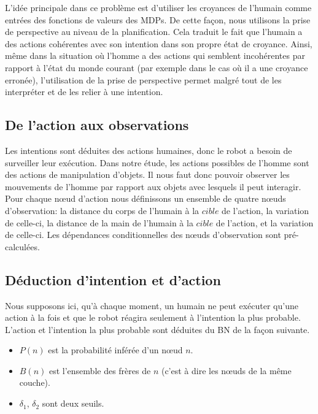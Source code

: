 \documentclass[a4paper,11pt,twoside]{StyleThese}
\begin{document}
L'idée principale dans ce problème est d'utiliser les croyances de l'humain comme entrées des fonctions de valeurs des MDPs. De cette façon, nous utilisons la prise de perspective au niveau de la planification. Cela traduit le fait que l'humain a des actions cohérentes avec son intention dans son propre état de croyance. Ainsi, même dans la situation où l'homme a des actions qui semblent incohérentes par rapport à l'état du monde courant (par exemple dans le cas où il a une croyance erronée), l'utilisation de la prise de perspective permet malgré tout de les interpréter et de les relier à une intention.


\subsection{De l'action aux observations}
\label{sec:action}
Les intentions sont déduites des actions humaines, donc le robot a besoin de surveiller leur exécution.
Dans notre étude, les actions possibles de l'homme sont des actions de manipulation d'objets. Il nous faut donc pouvoir observer les mouvements de l'homme par rapport aux objets avec lesquels il peut interagir. Pour chaque nœud d'action nous définissons un ensemble de quatre nœuds d'observation: la distance du corps de l'humain à la $cible$ de l'action, la variation de celle-ci, la distance de la main de l'humain à la $cible$ de l'action, et la variation de celle-ci.
Les dépendances conditionnelles des nœuds d'observation sont pré-calculées.

\subsection{Déduction d'intention et d'action}
\label{sec:intentionactioninf}
Nous supposons ici, qu'à chaque moment, un humain ne peut exécuter qu'une action à la fois et que le robot réagira seulement à l'intention la plus probable. L'action et l'intention la plus probable sont déduites du BN de la façon suivante. 

\begin{itemize}
\item $P(n)$ est la probabilité inférée d'un nœud $n$.
\item $B(n)$ est l'ensemble des frères de $n$ (c'est à dire les nœuds de la même couche).
\item $\delta_1$, $\delta_2$ sont deux seuils.
\end{itemize}
\end{document}
